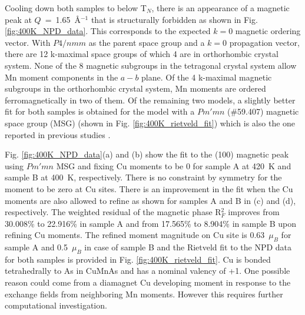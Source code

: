\documentclass[10pt,doublespacing,edeposit]{uiucthesis2020}
\begin{document}
\begin{mainmatter}
Cooling down both samples to below T$_N$, there is an appearance of a magnetic peak at $Q$~=~1.65~\AA$^{-1}$ that is structurally forbidden as shown in Fig. \ref{fig:400K_NPD_data}. This corresponds to the expected $k = 0$ magnetic ordering vector. With $P4/nmm$ as the parent space group and a $k = 0$ propagation vector, there are 12 k-maximal space groups of which 4 are in orthorhombic crystal system. None of the 8 magnetic subgroups in the tetragonal crystal system allow Mn moment components in the $a-b$ plane. Of the 4 k-maximal magnetic subgroups in the orthorhombic crystal system, Mn moments are ordered ferromagnetically in two of them. Of the remaining two models, a slightly better fit for both samples is obtained for the model with a $Pm'mn$ (\#59.407) magnetic space group (MSG) (shown in Fig. \ref{fig:400K_rietveld_fit}) which is also the one reported in previous studies \cite{Wadley2015}.

Fig. \ref{fig:400K_NPD_data}(a) and (b) show the fit to the (100) magnetic peak using $Pm'mn$ MSG and fixing Cu moments to be 0 for sample A at 420~K and sample B at 400~K, respectively. There is no constraint by symmetry for the moment to be zero at Cu sites. There is an improvement in the fit when the Cu moments are also allowed to refine as shown for samples A and B in (c) and (d), respectively. The weighted residual of the magnetic phase R$_F^2$ improves from 30.008\% to 22.916\% in sample A and from 17.565\% to 8.904\% in sample B upon refining Cu moments. The refined moment magnitude on Cu site is 0.63~$\mu_B$ for sample A and 0.5~$\mu_B$ in case of sample B and the Rietveld fit to the NPD data for both samples is provided in Fig. \ref{fig:400K_rietveld_fit}. 
Cu is bonded tetrahedrally to As in CuMnAs and has a nominal valency of +1. One possible reason could come from a diamagnet Cu developing moment in response to the exchange fields from neighboring Mn moments. However this requires further computational investigation. %




\end{mainmatter}
\end{document}
